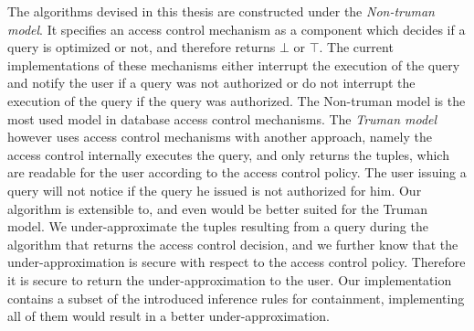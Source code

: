 The algorithms devised in this thesis are constructed under the \emph{Non-truman model}.
%
It specifies an access control mechanism as a component which decides if a query is optimized or not, and therefore returns $\bot$ or $\top$.
%
The current implementations of these mechanisms either interrupt the execution of the query and notify the user if a query was not authorized or do not interrupt the execution of the query if the query was authorized.
%
The Non-truman model is the most used model in database access control mechanisms.
%
The \emph{Truman model} however uses access control mechanisms with another approach, namely the access control internally executes the query, and only returns the tuples, which are readable for the user according to the access control policy.
%
The user issuing a query will not notice if the query he issued is not authorized for him.
%
Our algorithm is extensible to, and even would be better suited for the Truman model.
%
We under-approximate the tuples resulting from a query during the algorithm that returns the access control decision, and we further know that the under-approximation is secure with respect to the access control policy.
%
Therefore it is secure to return the under-approximation to the user.
%
Our implementation contains a subset of the introduced inference rules for containment, implementing all of them would result in a better under-approximation.

